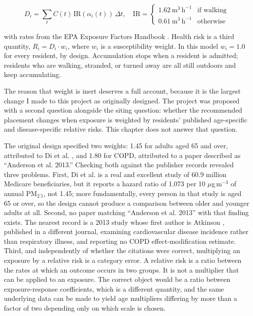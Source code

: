 \documentclass[graybox]{svmult}
\begin{document}
\begin{equation}
\label{eq:dose}
D_i = \sum_t C(t)\, \mathrm{IR}(\alpha_i(t))\, \Delta t,
\quad
\mathrm{IR} =
\begin{cases}
1.62\ \mathrm{m}^{3}\,\mathrm{h}^{-1} & \text{if walking} \\[2pt]
0.61\ \mathrm{m}^{3}\,\mathrm{h}^{-1} & \text{otherwise}
\end{cases}
\end{equation}

with rates from the EPA Exposure Factors Handbook \cite{epaefh2011}. Health risk
is a third quantity, $R_i = D_i \cdot w_i$, where $w_i$ is a susceptibility
weight. In this model $w_i = 1.0$ for every resident, by design. Accumulation
stops when a resident is admitted; residents who are walking, stranded, or turned
away are all still outdoors and keep accumulating.

The reason that weight is inert deserves a full account, because it is the
largest change I made to this project as originally designed. The project was
proposed with a second question alongside the siting question: whether the
recommended placement changes when exposure is weighted by residents' published
age-specific and disease-specific relative risks. This chapter does not answer
that question.

The original design specified two weights: 1.45 for adults aged 65 and over,
attributed to Di et al. \cite{di2017}, and 1.80 for COPD, attributed to a paper
described as ``Anderson et al. 2013.'' Checking both against the publisher
records revealed three problems. First, Di et al. is a real and excellent study
of 60.9 million Medicare beneficiaries, but it reports a hazard ratio of 1.073
per 10 $\mu$g\,m$^{-3}$ of annual PM$_{2.5}$, not 1.45; more fundamentally, every
person in that study is aged 65 or over, so the design cannot produce a
comparison between older and younger adults at all. Second, no paper matching
``Anderson et al. 2013'' with that finding exists. The nearest record is a 2013
study whose first author is Atkinson \cite{atkinson2013}, published in a
different journal, examining cardiovascular disease incidence rather than
respiratory illness, and reporting no COPD effect-modification estimate. Third,
and independently of whether the citations were correct, multiplying an exposure
by a relative risk is a category error. A relative risk is a ratio between the
rates at which an outcome occurs in two groups. It is not a multiplier that can
be applied to an exposure. The correct object would be a ratio between
exposure-response coefficients, which is a different quantity, and the same
underlying data can be made to yield age multipliers differing by more than a
factor of two depending only on which scale is chosen.
\end{document}

